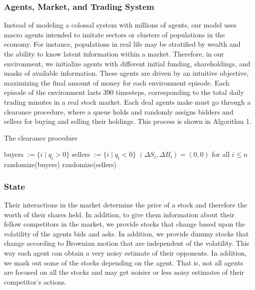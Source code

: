 \documentclass{article}
\begin{document}
\subsubsection{Agents, Market, and Trading System}

Instead of modeling a colossal system with millions of agents, our model uses macro agents intended to imitate sectors or clusters of populations in the economy. For instance, populations in real life may be stratified by wealth and the ability to know latent information within a market. Therefore, in our environment, we initialize agents with different initial funding, shareholdings, and masks of available information. These agents are driven by an intuitive objective, maximizing the final amount of money for each environment episode. Each episode of the environment lasts 390 timesteps, corresponding to the total daily trading minutes in a real stock market. Each deal agents make must go through a clearance procedure, where a queue holds and randomly assigns bidders and sellers for buying and selling their holdings. This process is shown in Algorithm 1.

\begin{algorithm}[hbt!]
\caption{The clearance procedure}\label{algo:1}
 buyers $:= \{i \mid q_i > 0\}$\;
 sellers $:= \{i \mid q_i < 0\}$\;
 $(\Delta S_i, \Delta B_i) = (0, 0)$ for all $i \leq n$\;
 randomize(buyers)\;
 randomize(sellers)\;
\end{algorithm}

\subsubsection{State}
Their interactions in the market determine the price of a stock and therefore the worth of their shares held. In addition, to give them information about their fellow competitors in the market, we provide stocks that change based upon the volatility of the agents bids and asks. In addition, we provide dummy stocks that change according to Brownian motion that are independent of the volatility. This way each agent can obtain a very noisy estimate of their opponents. In addition, we mask out some of the stocks depending on the agent. That is, not all agents are focused on all the stocks and may get noisier or less noisy estimates of their competitor's actions. 
\end{document}
